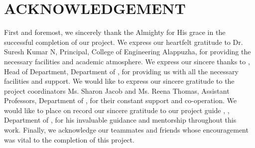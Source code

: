 \chapter*{\centering ACKNOWLEDGEMENT}%
%

First and foremost, we sincerely thank the Almighty for His grace in the successful completion of our project. We express our heartfelt gratitude to Dr. Suresh Kumar N, Principal, College of Engineering Alappuzha, for providing the necessary facilities and academic atmosphere. We express our sincere thanks to \hod, Head of Department, Department of \dept, for providing us with all the necessary facilities and support. We would like to express our sincere gratitude to the project coordinators Ms. Sharon Jacob and Ms. Reena Thomas, Assistant Professors, Department of \dept, for their constant support and co-operation. We would like to place on record our sincere gratitude to our project guide \guide, \guidedes, Department of \dept, for his invaluable guidance and mentorship throughout this work. Finally, we acknowledge our teammates and friends whose encouragement was vital to the completion of this project.

\vspace*{30pt}
\begin{flushright}
	\textbf{\studentA}\\
	\textbf{\studentB}\\
	\textbf{\studentC}\\
	\textbf{\studentD}\\
\end{flushright}
\thispagestyle{plain}
